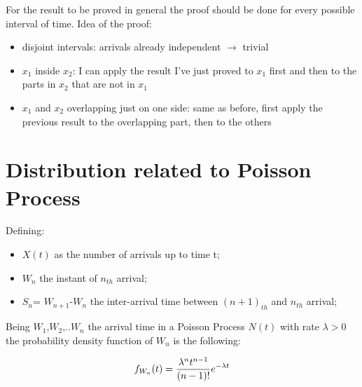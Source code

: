 \begin{itemize}
            For the result to be proved in general the proof should be done for every possible interval of time. Idea of the proof:
            \begin{itemize}
              \item disjoint intervals: arrivals already independent $\rightarrow$ trivial
              \item $x_1$ inside $x_2$: I can apply the result I've just proved to $x_1$ first and then to the parts in $x_2$ that are not in $x_1$
              \item $x_1$ and $x_2$ overlapping just on one side: same as before, first apply the previous result to the overlapping part, then to the others
            \end{itemize}



  \end{itemize}
\section{Distribution related to Poisson Process}
Defining:
\begin{itemize}
	\item $X(t)$ as the number of arrivals up to time t;
	\item $W_n$ the instant of $n_{th}$ arrival;
	\item $S_n$= $W_{n+1}$-$W_n$ the inter-arrival time between $(n+1)_{th}$ and $n_{th}$ arrival;
\end{itemize}


	\begin{theorem}
		Being $W_{1}$,$W_{2}$,..$W_{n}$ the arrival time in a Poisson Process $N(t)$ with rate ${\lambda}>0$ the probability density function of $W_n$ is the following:

			\begin{equation}
			f_{W_n} (t )=\frac{\lambda^n t^{n-1}} {(n-1)!}e^{-\lambda t} \\
			\end{equation}
	\end{theorem}

